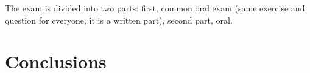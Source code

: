 \documentclass[11pt, a4paper, twoside, openright]{book}
\begin{document}
The exam is divided into two parts: first, common oral exam (same exercise and question for everyone, it is a written part), second part, oral.

\mainmatter
\pagestyle{fancy}














\backmatter
\pagestyle{plain}

\chapter{Conclusions}


\end{document}
